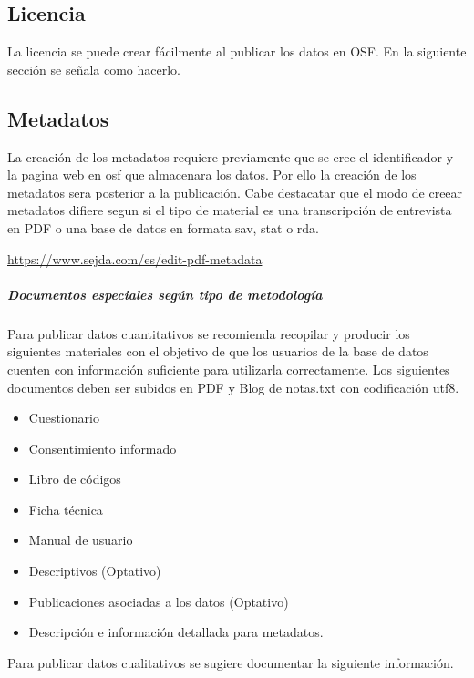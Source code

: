 \documentclass[
  14pt,
]{book}
\providecommand{\tightlist}{%
  \setlength{\itemsep}{0pt}\setlength{\parskip}{0pt}}
\begin{document}
\hypertarget{licencia}{%
\subsection{Licencia}\label{licencia}}

La licencia se puede crear fácilmente al publicar los datos en OSF. En la siguiente sección se señala como hacerlo.

\hypertarget{metadatos}{%
\subsection{Metadatos}\label{metadatos}}

La creación de los metadatos requiere previamente que se cree el identificador y la pagina web en osf que almacenara los datos. Por ello la creación de los metadatos sera posterior a la publicación. Cabe destacatar que el modo de creear metadatos difiere segun si el tipo de material es una transcripción de entrevista en PDF o una base de datos en formata sav, stat o rda.

\url{https://www.sejda.com/es/edit-pdf-metadata}

\hypertarget{documentos-especiales-seguxfan-tipo-de-metodologuxeda}{%
\subparagraph{Documentos especiales según tipo de metodología}\label{documentos-especiales-seguxfan-tipo-de-metodologuxeda}}

Para publicar datos cuantitativos se recomienda recopilar y producir los siguientes materiales con el objetivo de que los usuarios de la base de datos cuenten con información suficiente para utilizarla correctamente. Los siguientes documentos deben ser subidos en PDF y Blog de notas.txt con codificación utf8.

\begin{itemize}
\tightlist
\item
  Cuestionario
\item
  Consentimiento informado
\item
  Libro de códigos
\item
  Ficha técnica
\item
  Manual de usuario
\item
  Descriptivos (Optativo)
\item
  Publicaciones asociadas a los datos (Optativo)
\item
  Descripción e información detallada para metadatos.
\end{itemize}

Para publicar datos cualitativos se sugiere documentar la siguiente información.
\end{document}
